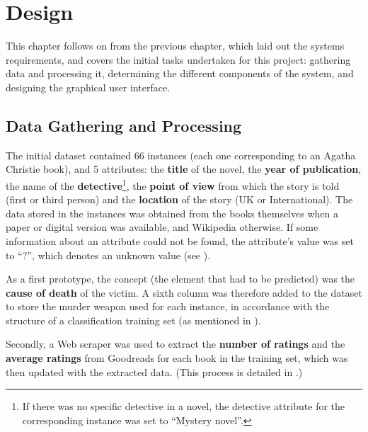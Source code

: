 \documentclass{mproj}
\begin{document}
\chapter{Design}

This chapter follows on from the previous chapter, which laid out the systems requirements, and covers the initial tasks undertaken for this project: gathering data and processing it, determining the different components of the system, and designing the graphical user interface. \par

\section{Data Gathering and Processing}\label{data_process}

The initial dataset contained 66 instances (each one corresponding to an Agatha Christie book), and 5 attributes: the \textbf{title} of the novel, the \textbf{year of publication}, the name of the \textbf{detective}\footnote{If there was no specific detective in a novel, the detective attribute for the corresponding instance was set to ``Mystery novel''.}, the \textbf{point of view} from which the story is told (first or third person) and the \textbf{location} of the story (UK or International). The data stored in the instances was obtained from the books themselves when a paper or digital version was available, and Wikipedia otherwise. \cite{wikipedia} If some information about an attribute could not be found, the attribute's value was set to ``?'', which denotes an unknown value (see ).\par

As a first prototype, the concept (the element that had to be predicted) was the \textbf{cause of death} of the victim. A sixth column was therefore added to the dataset to store the murder weapon used for each instance, in accordance with the structure of a classification training set (as mentioned in ).\par

Secondly, a Web scraper was used to extract the \textbf{number of ratings} and the \textbf{average ratings} from Goodreads \cite{goodreads} for each book in the training set, which was then updated with the extracted data. (This process is detailed in .)\par
\end{document}
